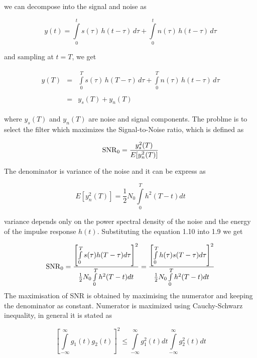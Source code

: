 we can decompose into the signal and noise as

\begin{equation}
y(t)=\int\limits_{0}^{t}s(\tau)\,h(t-\tau)\,d\tau + \int\limits_{0}^{t}n(\tau)\,h(t-\tau)\,d\tau
\end{equation}

and sampling at $t=T$, we get

\begin{eqnarray}
\begin{array}{lll}
y(T)&=&\int\limits_{0}^{T}s(\tau)\,h(T-\tau)\,d\tau + \int\limits_{0}^{T}n(\tau)\,h(t-\tau)\,d\tau \\ \\
&=&y_s(T)+y_n(T)
\end{array}
\end{eqnarray}

where $y_s(T)$ and $y_n(T)$ are noise and signal components. The problme is to select the filter which maximizes the Signal-to-Noise ratio, which is defined as

\begin{equation}
\mathrm{SNR}_0=\frac{\hbox{$y_s^2(T)$}}{\hbox{$E[y_n^2(T)]$}}
\end{equation}

The denominator is variance of the noise and it can be express as 

\begin{equation}
E[y_n^2(T)]=\frac{1}{2}N_0\int\limits_{0}^{T}h^2(T-t)dt
\end{equation}

variance depends only on the power spectral density of the noise and the energy of the impulse response $h(t)$. Substituting the equation 1.10 into 1.9 we get 

\begin{equation}
\mathrm{SNR}_0=\frac{\hbox{$\left[\int\limits_{0}^{T}s(\tau)h(T-\tau)d\tau \right ]^2$}}{\hbox{$\frac{1}{2}N_0\int\limits_{0}^{T}h^2(T-t)dt$}}=\frac{\hbox{$\left [\int\limits_{0}^{T}h(\tau)s(T-\tau)d\tau \right]^2$}}{\hbox{$\frac{1}{2}N_0\int\limits_{0}^{T}h^2(T-t)dt$}}
\end{equation}
The maximisation of SNR is obtained by maximising the numerator and keeping the denominator as constant. Numerator is maximized using Cauchy-Schwarz inequality, in general it is stated as

\begin{equation}
\left[\int\limits_{-\infty}^{\infty}g_1(t)g_2(t)\right ] ^2 \leq \int\limits_{-\infty}^{\infty} g_1^2(t)dt \int\limits_{-\infty}^{\infty}g_2^2(t)dt
\end{equation}

